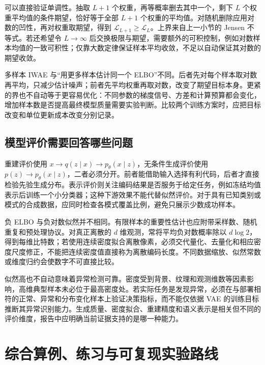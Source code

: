 \documentclass[UTF8,12pt,a4paper,fontset=fandol]{ctexart}
\begin{document}
可以直接验证单调性。抽取 $L+1$ 个权重，再等概率删去其中一个，剩下 $L$ 个权重平均值的条件期望，恰好等于全部 $L+1$ 个权重的平均值。对随机删除应用对数的凹性，再对权重取期望，得到 $\mathcal L_{L+1}\geq\mathcal L_L$。上界来自上一小节的 Jensen 不等式。若还希望令 $L\to\infty$ 后交换极限与期望，需要额外的可积控制，例如对数样本均值的一致可积性；仅靠大数定律保证样本平均收敛，不足以自动保证其对数的期望收敛。

多样本 IWAE 与“用更多样本估计同一个 ELBO”不同。后者先对每个样本取对数再平均，只减少估计噪声；前者先平均权重再取对数，改变了期望目标本身。更紧的界也不自动等于更容易优化：不同参数的梯度信号、方差和计算预算都会变化，增加样本数是否提高最终模型质量需要实验判断。比较两个训练方案时，应把目标改变和单位更新成本改变分别记录。

\subsection{模型评价需要回答哪些问题}
重建评价使用 $x\to q(z\mid x)\to p_\theta(x\mid z)$，无条件生成评价使用 $p(z)\to p_\theta(x\mid z)$，二者必须分开。前者能借助输入选择有利代码，后者才直接检验先验生成分布。表示评价则关注编码结果是否服务于给定任务，例如冻结均值表示后训练一个小分类器；这种下游效果不能代替似然评价。对于具有已知类别或模式的合成数据，应同时检查各模式覆盖比例，避免只展示少数成功样本。

负 ELBO 与负对数似然并不相同。有限样本的重要性估计也应附带采样数、随机重复和预处理协议。对真正离散的 $d$ 维观测，常将平均负对数概率除以 $d\log2$，得到每维比特数；若使用连续密度拟合离散像素，必须交代量化、去量化和相应密度尺度修正，不能把连续密度值直接称为离散编码长度。不同数据缩放、似然常数或维度归约会使数字不可直接比较。

似然高也不自动意味着异常检测可靠。密度受到背景、纹理和观测维数等因素影响，高维典型样本未必位于最高密度处。若实际任务是发现异常，必须在与部署相符的正常、异常和分布变化样本上验证决策指标，而不能仅依据 VAE 的训练目标推断其异常识别能力。生成质量、密度拟合、重建精度和语义表示是相关但不同的评价维度，报告中应明确当前证据支持的是哪一种能力。

\section{综合算例、练习与可复现实验路线}
\label{sec:vae-exercises}
\end{document}
